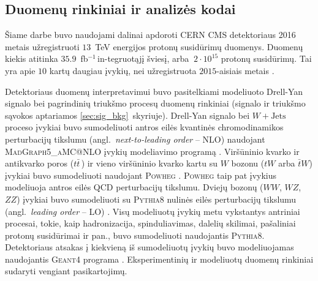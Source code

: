\documentclass[a4paper, 12pt, oneside]{article}
\newcommand{\ZZ}{Z\! Z}
\newcommand{\WZ}{W\! Z}
\newcommand{\tbarW}{\bar{t}W}
\newcommand{\WJets}{W\! +\!\mathrm{Jets}}
\newcommand{\invfb}{fb$^{-1}\,$}
\begin{document}
\subsection{Duomenų rinkiniai ir analizės kodai}\label{sec:data}
Šiame darbe buvo naudojami dalinai apdoroti CERN CMS detektoriaus 2016 metais užregistruoti $13$~TeV
energijos protonų susidūrimų duomenys.
Duomenų kiekis atitinka $35.9$~\invfb in-tegruotąjį šviesį, arba $~2 \cdot 10^{15}$ protonų susidūrimų.
Tai yra apie $10$ kartų daugiau įvykių, nei užregistruota $2015$-aisiais metais \cite{DY2019}.

Detektoriaus duomenų interpretavimui buvo pasitelkiami modeliuoto Drell-Yan signalo bei pagrindinių triukšmo
procesų duomenų rinkiniai (signalo ir triukšmo sąvokos aptariamos \ref{sec:sig_bkg}~skyriuje).
Drell-Yan signalo bei $\WJets$ proceso įvykiai buvo sumodeliuoti antros eilės kvantinės chromodinamikos
perturbacijų tikslumu  (angl.\ \textit{next-to-leading order} -- NLO) naudojant \textsc{MadGraph5\_aMC@NLO} įvykių
modeliavimo programą \cite{MG_aMCatNLO}.
Viršūninio kvarko ir antikvarko poros ($t\bar{t}\,$) ir vieno viršūninio kvarko kartu su $W$ bozonu ($tW$ arba
$\tbarW$) įvykiai buvo sumodeliuoti naudojant \textsc{Powheg} \cite{powheg_ttbar, powheg_tW}.
\textsc{Powheg} taip pat įvykius modeliuoja antros eilės QCD perturbacijų tikslumu.
Dviejų bozonų ($WW$, $\WZ$, $\ZZ$) įvykiai buvo sumodeliuoti su \textsc{Pythia8} nulinės eilės perturbacijų tikslumu
(angl.\ \textit{leading order} -- LO) \cite{pythia82}.
Visų modeliuotų įvykių metu vykstantys antriniai procesai, tokie, kaip hadronizacija, spinduliavimas, dalelių skilimai,
pašaliniai protonų susidūrimai ir pan., buvo sumodeliuoti naudojantis \textsc{Pythia8}.
Detektoriaus atsakas į kiekvieną iš sumodeliuotų įvykių buvo modeliuojamas naudojantis \textsc{Geant4} programa
\cite{geant4}.
Eksperimentinių ir modeliuotų duomenų rinkiniai sudaryti vengiant pasikartojimų.
\end{document}
